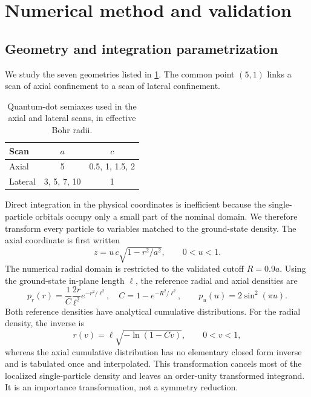 \section{Numerical method and validation}
\label{sec:numerics}

\subsection{Geometry and integration parametrization}
\label{sec:importance}

We study the seven geometries listed in \cref{tab:geometries}. The common
point $(5,1)$ links a scan of axial confinement to a scan of lateral
confinement.

\begin{table}[ht]
 \centering
 \caption{Quantum-dot semiaxes used in the axial and lateral scans, in
 effective Bohr radii.}
 \label{tab:geometries}
 \begin{tabular}{lcc}
  \toprule
  Scan & $a$ & $c$\\
  \midrule
  Axial & 5 & 0.5, 1, 1.5, 2\\
  Lateral & 3, 5, 7, 10 & 1\\
  \bottomrule
 \end{tabular}
\end{table}

Direct integration in the physical coordinates is inefficient because the
single-particle orbitals occupy only a small part of the nominal domain. We
therefore transform every particle to variables matched to the ground-state
density. The axial coordinate is first written
\begin{equation}
 z=u\,c\sqrt{1-r^2/a^2},\qquad 0<u<1 .
 \label{eq:axial-map}
\end{equation}
The numerical radial domain is restricted to the validated cutoff $R=0.9a$.
Using the ground-state in-plane length $\ell$, the reference radial and axial
densities are
\begin{equation}
 p_r(r)=\frac{1}{C}\frac{2r}{\ell^2}e^{-r^2/\ell^2},
 \quad C=1-e^{-R^2/\ell^2},
 \qquad
 p_u(u)=2\sin^2(\pi u).
 \label{eq:reference-densities}
\end{equation}
Both reference densities have analytical cumulative distributions. For the
radial density, the inverse is
\begin{equation}
 r(v)=\ell\sqrt{-\ln(1-Cv)},\qquad 0<v<1,
 \label{eq:radial-inverse}
\end{equation}
whereas the axial cumulative distribution has no elementary closed form inverse and is tabulated once and
interpolated. This transformation cancels most of the localized
single-particle density and leaves an order-unity transformed integrand. It is
an importance transformation, not a symmetry reduction.

